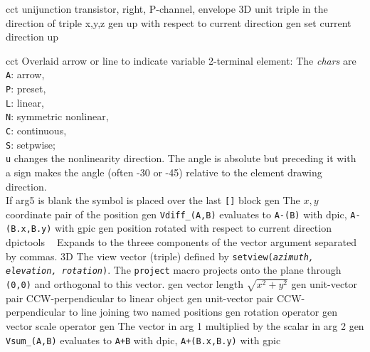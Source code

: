 %
  {cct}%
  {unijunction transistor, right, P-channel, envelope
    }%
%
  {3D} {unit triple in the direction of triple x,y,z}%
%
  {gen}%
  {up with respect to current direction}%
%
  {gen}%
  {set current direction up }%

%

%
  {cct}%
  {Overlaid arrow or line to indicate variable 2-terminal element:
    The {\sl chars} are\\
    {\tt A}: arrow,\\
    {\tt P}: preset,\\
    {\tt L}: linear,\\
    {\tt N}:  symmetric nonlinear,\\
    {\tt C}: continuous,\\
    {\tt S}: setpwise;\\
    {\tt u} changes the nonlinearity direction.  The angle is absolute
    but preceding it with a sign makes the angle (often -30 or -45)
    relative to the element drawing direction.\\
    If arg5 is blank the symbol is placed over the last {\tt []} block
   }%
%
  {gen}%
  {The $x, y$ coordinate pair of the position}%
%
  {gen}%
  {{\tt Vdiff\_(A,B)} evaluates to {\tt A-(B)} with dpic, {\tt A-(B.x,B.y)}
   with gpic}%
%
  {gen}%
  {position rotated with respect to current direction}%
%
  {dpictools}%
  {$\;\;$ Expands to the threee components of the vector argument separated
    by commas.}%
%
  {3D} {The view vector (triple) defined by {\tt setview({\sl azimuth,
   elevation, rotation})}. The {\tt project} macro projects onto the plane
   through {\tt (0,0)} and orthogonal to this vector.}%
%
  {gen}%
  {vector length $\sqrt{x^2+y^2}$}%
%
  {gen}%
  {unit-vector pair CCW-perpendicular to linear object}%
%
  {gen}%
  {unit-vector pair CCW-perpendicular to line joining two named positions}%
%
  {gen}%
  {rotation operator}%
%
  {gen}%
  {vector scale operator}%
%
  {gen}%
  {The vector in arg 1 multiplied by the scalar in arg 2}%
%
  {gen}%
  {{\tt Vsum\_(A,B)} evaluates to {\tt A+B} with dpic, {\tt A+(B.x,B.y)}
   with gpic}%

